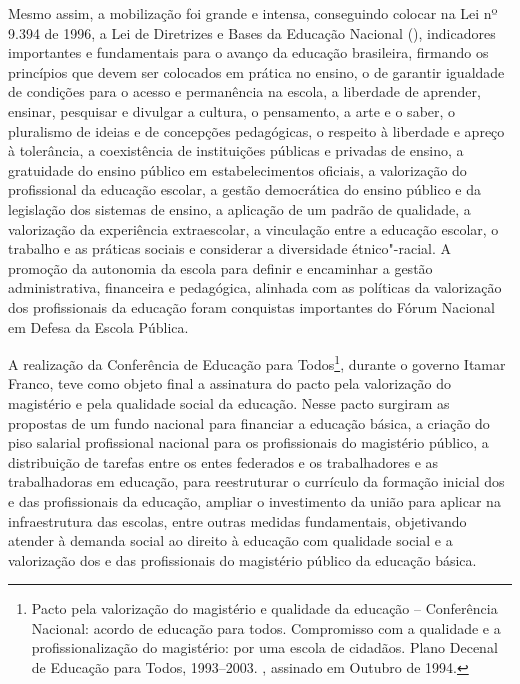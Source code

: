 Mesmo assim, a mobilização foi grande e intensa, conseguindo colocar na
Lei nº 9.394 de 1996, a Lei de Diretrizes e Bases da Educação Nacional
(), indicadores importantes e fundamentais para o avanço da educação
brasileira, firmando os princípios que devem ser colocados em prática no
ensino, o de garantir igualdade de
condições para o acesso e permanência na escola,
a liberdade de aprender, ensinar,
pesquisar e divulgar a cultura, o pensamento, a arte e o saber,
o pluralismo de ideias e de concepções
pedagógicas, o respeito à liberdade e
apreço à tolerância, a coexistência de
instituições públicas e privadas de
ensino, a gratuidade do ensino público
em estabelecimentos oficiais, a
valorização do profissional da educação
escolar, a gestão democrática do
ensino público e da legislação dos sistemas de ensino,
a aplicação de um padrão de qualidade,
a valorização da experiência
extraescolar, a vinculação entre a
educação escolar, o trabalho e as práticas sociais
e considerar a diversidade
étnico"-racial. A promoção da autonomia da escola para definir e
encaminhar a gestão administrativa, financeira e pedagógica, alinhada
com as políticas da valorização dos profissionais da educação foram
conquistas importantes do Fórum Nacional em Defesa da Escola
Pública.

A realização da Conferência de Educação para Todos\footnote{Pacto pela
  valorização do magistério e qualidade da educação -- Conferência
  Nacional: acordo de educação para todos. Compromisso com a qualidade e
  a profissionalização do magistério: por uma escola de cidadãos. Plano
  Decenal de Educação para Todos, 1993--2003. , assinado em Outubro de
  1994.}, durante o governo Itamar Franco, teve como objeto final a
assinatura do pacto pela valorização do magistério e pela qualidade
social da educação. Nesse pacto surgiram as propostas de um fundo
nacional para financiar a educação básica, a criação do piso salarial
profissional nacional para os profissionais do magistério público, a
distribuição de tarefas entre os entes federados e os trabalhadores e as
trabalhadoras em educação, para reestruturar o currículo da formação
inicial dos e das profissionais da educação, ampliar o investimento da
união para aplicar na infraestrutura das escolas, entre outras medidas
fundamentais, objetivando atender à demanda social ao direito à educação
com qualidade social e a valorização dos e das profissionais do
magistério público da educação básica.

